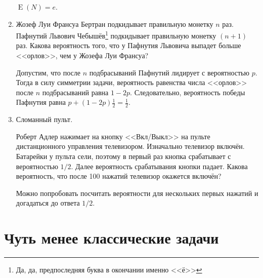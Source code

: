 \documentclass[nobib]{tufte-handout}
\DeclareMathOperator{\E}{E}
\begin{document}
\begin{enumerate}
\begin{solution}
$\E(N)=e$.
\end{solution}


\item Жозеф Луи Франсуа Бертран подкидывает правильную монетку $n$ раз. Пафнутий Львович Чебышёв\footnote{Да, да, предпоследняя буква в окончании именно <<ё>>} подкидывает правильную монетку $(n+1)$ раз. Какова вероятность того, что у Пафнутия Львовича выпадет больше <<орлов>>, чем у Жозефа Луи Франсуа?

\begin{solution}
Допустим, что после $n$ подбрасываний Пафнутий лидирует с вероятностью $p$. Тогда в силу симметрии задачи, вероятность равенства числа <<орлов>> после $n$ подбрасываний равна $1-2p$. Следовательно, вероятность победы Пафнутия равна $p+(1-2p)\frac{1}{2}=\frac{1}{2}$.
\end{solution}

\item Сломанный пульт. 

Роберт Адлер нажимает на кнопку <<Вкл/Выкл>> на пульте дистанционного управления телевизором. Изначально телевизор включён. Батарейки у пульта сели, поэтому в первый раз кнопка срабатывает с вероятностью $1/2$. Далее вероятность срабатывания кнопки падает. Какова вероятность, что после 100 нажатий телевизор окажется включён?


\begin{solution}
Можно попробовать посчитать вероятности для нескольких первых нажатий и догадаться до ответа $1/2$.
\end{solution}


\end{enumerate}

\section{Чуть менее классические задачи}
\end{document}
